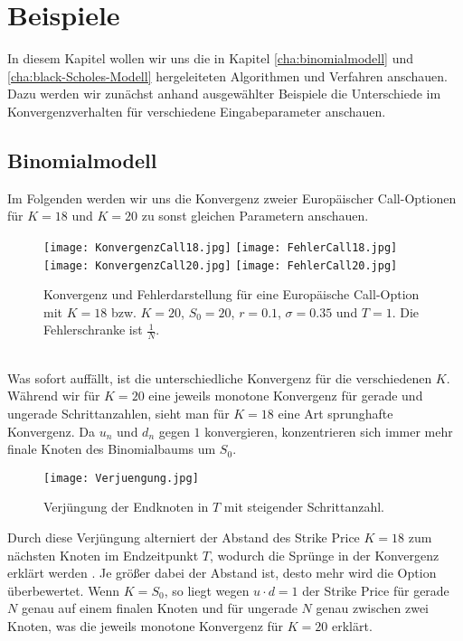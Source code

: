 \chapter{Beispiele}
\label{cha:Beispiele}
In diesem Kapitel wollen wir uns die in Kapitel \ref{cha:binomialmodell} und \ref{cha:black-Scholes-Modell} hergeleiteten Algorithmen und Verfahren anschauen. Dazu werden wir zunächst anhand ausgewählter Beispiele die Unterschiede im Konvergenzverhalten für verschiedene Eingabeparameter anschauen.

\section{Binomialmodell}\label{BSP:BINModell}
Im Folgenden werden wir uns die Konvergenz zweier Europäischer Call-Optionen für $K=18$ und $K=20$ zu sonst gleichen Parametern anschauen.
\begin{figure}[h]
\texttt{[image: KonvergenzCall18.jpg]}
\texttt{[image: FehlerCall18.jpg]} \\
\texttt{[image: KonvergenzCall20.jpg]}
\texttt{[image: FehlerCall20.jpg]}
\caption{Konvergenz und Fehlerdarstellung für eine Europäische Call-Option mit $K=18$ bzw. $K=20$, $S_0=20$, $r = 0.1$, $\sigma = 0.35$ und $T=1$. Die Fehlerschranke ist $\frac{1}{N}$.}
\end{figure}\\
Was sofort auffällt, ist die unterschiedliche Konvergenz für die verschiedenen $K$. Während wir für $K=20$ eine jeweils monotone Konvergenz für gerade und ungerade Schrittanzahlen, sieht man für $K=18$ eine Art \glqq sprunghafte\grqq\, Konvergenz. Da $u_n$ und $d_n$ gegen $1$ konvergieren, konzentrieren sich immer mehr finale Knoten des Binomialbaums um $S_0$. 
\begin{figure}[h]
\texttt{[image: Verjuengung.jpg]}
\caption{Verjüngung der Endknoten in $T$ mit steigender Schrittanzahl.}
\end{figure}

Durch diese Verjüngung alterniert der Abstand des Strike Price $K=18$ zum nächsten Knoten im Endzeitpunkt $T$, wodurch die Sprünge in der Konvergenz erklärt werden \cite{LeisenReimer}. Je größer dabei der Abstand ist, desto mehr wird die Option überbewertet. Wenn $K=S_0$, so liegt wegen $u\cdot d = 1$ der Strike Price für gerade $N$ genau auf einem finalen Knoten und für ungerade $N$ genau zwischen zwei Knoten, was die jeweils monotone Konvergenz für $K=20$ erklärt.


